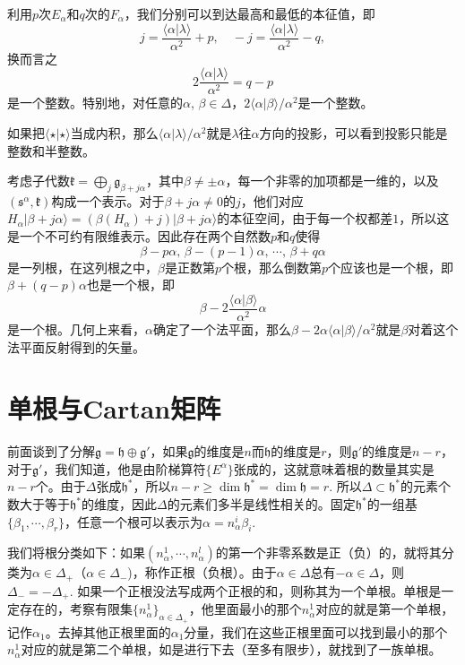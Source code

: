 \documentclass[9pt]{extarticle}
\newcommand{\lag}{{\mathfrak{g}}}
\begin{document}
利用$p$次$E_\alpha$和$q$次的$F_\alpha$，我们分别可以到达最高和最低的本征值，即
\[
	j =\frac{\langle\alpha|\lambda\rangle}{\alpha^2}+p,\quad -j=\frac{\langle\alpha|\lambda\rangle}{\alpha^2}-q,
\]
换而言之
\[
	2\frac{\langle\alpha|\lambda\rangle}{\alpha^2}=q-p
\]
是一个整数。特别地，对任意的$\alpha$, $\beta\in \Delta$，$2\langle \alpha|\beta \rangle/\alpha^2$是一个整数。

如果把$\langle \star|\star \rangle$当成内积，那么$\langle \alpha|\lambda \rangle/\alpha^2$就是$\lambda$往$\alpha$方向的投影，可以看到投影只能是整数和半整数。

\para 考虑子代数$\mathfrak{k}=\bigoplus_j\lag_{\beta+j\alpha}$，其中$\beta\neq \pm \alpha$，每一个非零的加项都是一维的，以及$(\mathfrak{s}^\alpha,\mathfrak{k})$构成一个表示。对于$\beta+j\alpha\neq 0$的$j$，他们对应$H_\alpha|\beta+j\alpha\rangle =(\beta(H_\alpha)+j)|\beta+j\alpha\rangle$的本征空间，由于每一个权都差$1$，所以这是一个不可约有限维表示。因此存在两个自然数$p$和$q$使得
\[
	\beta-p\alpha,\,\beta-(p-1)\alpha,\,\cdots,\,\beta+q\alpha
\]
是一列根，在这列根之中，$\beta$是正数第$p$个根，那么倒数第$p$个应该也是一个根，即$\beta+(q-p)\alpha$也是一个根，即
\[
	\beta-2\frac{\langle \alpha|\beta \rangle}{\alpha^2}\alpha
\]
是一个根。几何上来看，$\alpha$确定了一个法平面，那么$\beta-2\alpha\langle \alpha|\beta \rangle/\alpha^2$就是$\beta$对着这个法平面反射得到的矢量。

\section{单根与Cartan矩阵}

\para 前面谈到了分解$\lag=\mathfrak{h}\oplus \lag'$，如果$\lag$的维度是$n$而$\mathfrak{h}$的维度是$r$，则$\lag'$的维度是$n-r$，对于$\lag'$，我们知道，他是由阶梯算符$\{E^\alpha\}$张成的，这就意味着根的数量其实是$n-r$个。由于$\Delta$张成$\mathfrak{h}^*$，所以$n-r\geq\dim \mathfrak{h}^*=\dim \mathfrak{h}=r$. 所以$\Delta\subset \mathfrak{h}^*$的元素个数大于等于$\mathfrak{h}^*$的维度，因此$\Delta$的元素们多半是线性相关的。固定$\mathfrak{h}^*$的一组基$\{\beta_1,\cdots,\beta_r\}$，任意一个根可以表示为$\alpha=n^i_\alpha\beta_i$.

我们将根分类如下：如果$(n^1_\alpha,\cdots,n^l_\alpha)$的第一个非零系数是正（负）的，就将其分类为$\alpha\in \Delta_+$（$\alpha\in \Delta_-$)，称作正根（负根）。由于$\alpha\in \Delta$总有$-\alpha\in \Delta$，则$\Delta_-=-\Delta_+$. 如果一个正根没法写成两个正根的和，则称其为一个单根。单根是一定存在的，考察有限集$\{n^1_\alpha\}_{\alpha\in \Delta_+}$，他里面最小的那个$n^1_\alpha$对应的就是第一个单根，记作$\alpha_1$。去掉其他正根里面的$\alpha_1$分量，我们在这些正根里面可以找到最小的那个$n^1_\alpha$对应的就是第二个单根，如是进行下去（至多有限步），就找到了一族单根。
\end{document}
